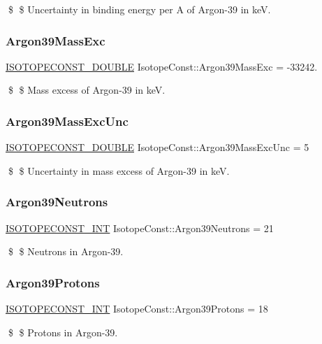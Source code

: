 \$ \$ Uncertainty in binding energy per A of Argon-\/39 in keV. \mbox{\label{group___isotope_const-_argon-_ar39_gab00c22656d0a95cbb5754b9cccb765c1}} 
\subsubsection{\texorpdfstring{Argon39\+Mass\+Exc}{Argon39MassExc}}
{\footnotesize\ttfamily \mbox{\hyperlink{group___isotope_const-_macros_ga8f45a7272ce02c0b4c65c44636ed719a}{I\+S\+O\+T\+O\+P\+E\+C\+O\+N\+S\+T\+\_\+\+D\+O\+U\+B\+LE}} Isotope\+Const\+::\+Argon39\+Mass\+Exc = -\/33242.}

\$ \$ Mass excess of Argon-\/39 in keV. \mbox{\label{group___isotope_const-_argon-_ar39_gac779dbb269507e624c65f912c96e6a48}} 
\subsubsection{\texorpdfstring{Argon39\+Mass\+Exc\+Unc}{Argon39MassExcUnc}}
{\footnotesize\ttfamily \mbox{\hyperlink{group___isotope_const-_macros_ga8f45a7272ce02c0b4c65c44636ed719a}{I\+S\+O\+T\+O\+P\+E\+C\+O\+N\+S\+T\+\_\+\+D\+O\+U\+B\+LE}} Isotope\+Const\+::\+Argon39\+Mass\+Exc\+Unc = 5}

\$ \$ Uncertainty in mass excess of Argon-\/39 in keV. \mbox{\label{group___isotope_const-_argon-_ar39_gaa96769aa43b999ac6e35bad7badac23b}} 
\subsubsection{\texorpdfstring{Argon39\+Neutrons}{Argon39Neutrons}}
{\footnotesize\ttfamily \mbox{\hyperlink{group___isotope_const-_macros_ga5f18360b3e99483a35c32d789e62621c}{I\+S\+O\+T\+O\+P\+E\+C\+O\+N\+S\+T\+\_\+\+I\+NT}} Isotope\+Const\+::\+Argon39\+Neutrons = 21}

\$ \$ Neutrons in Argon-\/39. \mbox{\label{group___isotope_const-_argon-_ar39_ga525d1674233424191053be59ce4fca70}} 
\subsubsection{\texorpdfstring{Argon39\+Protons}{Argon39Protons}}
{\footnotesize\ttfamily \mbox{\hyperlink{group___isotope_const-_macros_ga5f18360b3e99483a35c32d789e62621c}{I\+S\+O\+T\+O\+P\+E\+C\+O\+N\+S\+T\+\_\+\+I\+NT}} Isotope\+Const\+::\+Argon39\+Protons = 18}

\$ \$ Protons in Argon-\/39. 